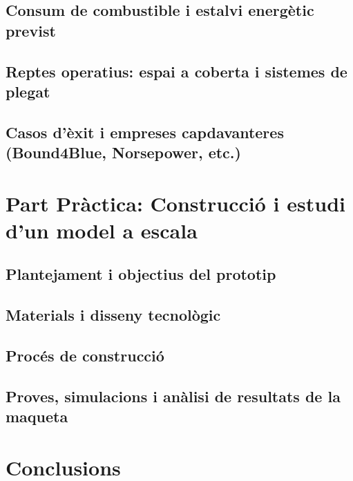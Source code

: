 \documentclass[12pt, a4paper]{report}
\begin{document}
\section{Consum de combustible i estalvi energètic previst}

\section{Reptes operatius: espai a coberta i sistemes de plegat}

\section{Casos d'èxit i empreses capdavanteres (Bound4Blue, Norsepower, etc.)}

\clearpage

\chapter{Part Pràctica: Construcció i estudi d'un model a escala}
\section{Plantejament i objectius del prototip}

\section{Materials i disseny tecnològic}

\section{Procés de construcció}

\section{Proves, simulacions i anàlisi de resultats de la maqueta}

\clearpage

\chapter*{Conclusions}
\end{document}
